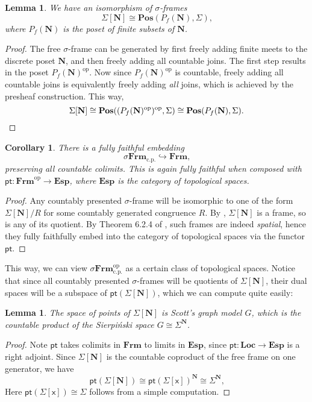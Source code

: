 \documentclass[a4paper,12pt]{amsart}
\newtheorem{lemma}[theorem]{Lemma}
\newtheorem{corollary}[theorem]{Corollary}
\theoremstyle{definition}
\newcommand{\mb}[1]{\mathbf{#1}}
\newcommand{\mr}[1]{\mathrm{#1}}
\newcommand{\ms}[1]{\mathsf{#1}}
\newcommand{\Pos}{\mb{Pos}}
\newcommand{\op}{^{\mathrm{op}}}
\newcommand{\hook}{\hookrightarrow}
\newcommand{\cp}{_{\mr{c.p.}}}
\newcommand{\N}{\mb N}
\newcommand{\pt}{\ms{pt}}
\newcommand{\sFrm}{\sigma\mb{Frm}}
\newcommand{\Frm}{\mb{Frm}}
\newcommand{\Loc}{\mb{Loc}}
\newcommand{\Topp}{\mb{Esp}}
\begin{document}
\begin{lemma}\label{lem:cgfreesframe}
  We have an isomorphism of $\sigma$-frames
  \[ \Sigma[\N] \cong \Pos(P_f(\N),\Sigma)\text{,} \]
  where $P_f(\N)$ is the poset of finite subsets of $\N$.
\end{lemma}
\begin{proof}
  The free $\sigma$-frame can be generated by first freely adding finite meets to the discrete poset $\N$, and then freely adding all countable joins. The first step results in the poset $P_f(\N)\op$. Now since $P_f(\N)\op$ is countable, freely adding all countable joins is equivalently freely adding \emph{all} joins, which is achieved by the presheaf construction. This way,
  \[ \Sigma[\N] \cong \Pos((P_f(\N)\op)\op,\Sigma) \cong \Pos(P_f(\N),\Sigma). \qedhere \]
\end{proof}


\begin{corollary}\label{cor:dualsframe}
  There is a fully faithful embedding
  \[ \sFrm\cp \hook \Frm\text{,} \]
  preserving all countable colimits. This is again fully faithful when composed with $\ms{pt} \colon \Frm\op \to \Topp$, where $\Topp$ is the category of topological spaces.
\end{corollary}
\begin{proof}
  Any countably presented $\sigma$-frame will be isomorphic to one of the form $\Sigma[\N]/R$ for some countably generated congruence $R$. By , $\Sigma[\N]$ is a frame, so is any of its quotient. By Theorem 6.2.4 of \citet{makkai2006first}, such frames are indeed \emph{spatial}, hence they fully faithfully embed into the category of topological spaces via the functor $\pt$.
\end{proof}

This way, we can view $\sFrm\cp\op$ as a certain class of topological spaces. Notice that since all countably presented $\sigma$-frames will be quotients of $\Sigma[\N]$, their dual spaces will be a subspace of $\pt(\Sigma[\N])$, which we can compute quite easily:

\begin{lemma}
  The space of points of $\Sigma[\N]$ is Scott's graph model $G$, which is the countable product of the Sierpi\'nski space $G \cong \Sigma^\N$.
\end{lemma}
\begin{proof}
  Note $\pt$ takes colimits in $\Frm$ to limits in $\Topp$, since $\pt \colon \Loc \to \Topp$ is a right adjoint. Since $\Sigma[\N]$ is the countable coproduct of the free frame on one generator, we have
  \[ \pt(\Sigma[\N]) \cong \pt(\Sigma[\ms{x}])^\N \cong \Sigma^\N\text{,} \]
  Here $\pt(\Sigma[\ms{x}]) \cong \Sigma$ follows from a simple computation.
\end{proof}
\end{document}
